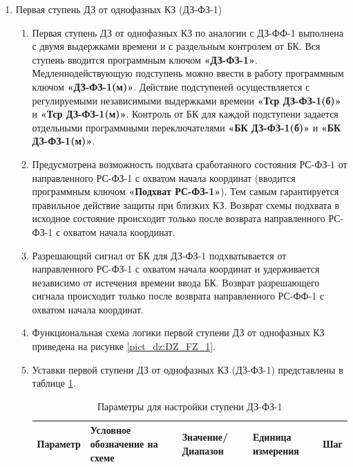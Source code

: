 \begin{enumerate}[label=\arabic{section}.\arabic{subsection}.\arabic{enumi}, labelsep=4pt, leftmargin=0pt, itemindent=57pt, itemsep=0pt, parsep=5pt]
\item\label{sec:sec1fz} Первая ступень ДЗ от однофазных КЗ (ДЗ-ФЗ-1)
\begin{enumerate}[label=\arabic{section}.\arabic{subsection}.\arabic{enumi}.\arabic*, labelsep=4pt, leftmargin=0em, itemindent=65pt, parsep=0pt]

\item
Первая ступень ДЗ от однофазных КЗ по аналогии с ДЗ-ФФ-1 выполнена с двумя выдержками времени и с раздельным контролем от БК. Вся ступень вводится программным ключом \textbf{«ДЗ-ФЗ-1»}. Медленнодействующую подступень можно ввести в работу программным ключом \textbf{«ДЗ-ФЗ-1(м)»}. Действие подступеней осуществляется с регулируемыми независимыми выдержками времени \textbf{«Тср ДЗ-ФЗ-1(б)»} и \textbf{«Тср ДЗ-ФЗ-1(м)»}. Контроль от БК для каждой подступени задается отдельными программными переключателями \textbf{«БК ДЗ-ФЗ-1(б)»} и \textbf{«БК ДЗ-ФЗ-1(м)»}.

\item
Предусмотрена возможность подхвата сработанного состояния РС-ФЗ-1 от направленного РС-ФЗ-1 с охватом начала координат (вводится программным ключом \textbf{«Подхват РС-ФЗ-1»}). Тем самым гарантируется правильное действие защиты при близких КЗ. Возврат схемы подхвата в исходное состояние происходит только после возврата направленного РС-ФЗ-1 с охватом начала координат.

\item
Разрешающий сигнал от БК для ДЗ-ФЗ-1 подхватывается от направленного РС-ФЗ-1 с охватом начала координат и удерживается независимо от истечения времени ввода БК. Возврат разрешающего сигнала происходит только после возврата направленного РС-ФФ-1 с охватом начала координат.

\item
Функциональная схема логики первой ступени ДЗ от однофазных КЗ приведена на рисунке \ref{pict_dz:DZ_FZ_1}.



\item
Уставки первой ступени ДЗ от однофазных КЗ (ДЗ-ФЗ-1) представлены в таблице \ref{desc_dz:tbl6}.

\small
\begin{longtable}{|>{\centering\arraybackslash}m{5.3cm}|>{\centering\arraybackslash}m{3.3cm}|>{\centering\arraybackslash}m{4.2cm}|>{\centering\arraybackslash}m{1.8cm}|>{\centering\arraybackslash}m{1cm}|}
\caption{Параметры для настройки ступени ДЗ-ФЗ-1\hfill\vspace{-0.5\baselineskip}}\label{desc_dz:tbl6}\\
\hline
\rowcolor{gray!30}
Параметр & Условное обозначение на схеме & Значение/ Диапазон & Единица измерения & Шаг \\
\hline
\endfirsthead


\end{longtable}
\end{enumerate}
\end{enumerate}
